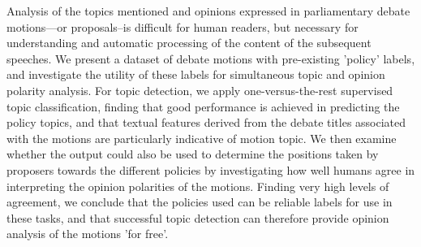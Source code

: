 Analysis of the topics mentioned and opinions expressed in parliamentary debate motions---or proposals--is difficult for human readers, but necessary for understanding and automatic processing of the content of the subsequent speeches. We present a dataset of debate motions with pre-existing 'policy' labels, and investigate the utility of these labels for simultaneous topic and opinion polarity analysis. For topic detection, we apply one-versus-the-rest supervised topic classification, finding that good performance is achieved in predicting the policy topics, and that textual features derived from the debate titles associated with the motions are particularly indicative of motion topic. We then examine whether the output could also be used to determine the positions taken by proposers towards the different policies by investigating how well humans agree in interpreting the opinion polarities of the motions. Finding very high levels of agreement, we conclude that the policies used can be reliable labels for use in these tasks, and that successful topic detection can therefore provide opinion analysis of the motions 'for free'.
